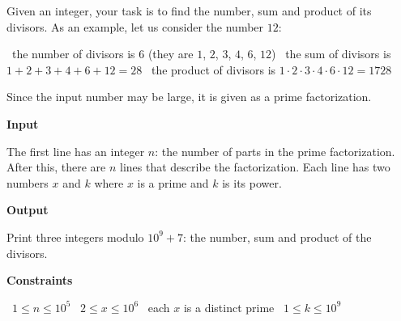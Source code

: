 Given an integer, your task is to find the number, sum and product of its divisors. As an example, let us consider the number $12$:

\textbullet\ the number of divisors is $6$ (they are $1$, $2$, $3$, $4$, $6$, $12$)
\textbullet\ the sum of divisors is $1+2+3+4+6+12=28$
\textbullet\ the product of divisors is $1 \cdot 2 \cdot 3 \cdot 4 \cdot 6 \cdot 12 = 1728$

Since the input number may be large, it is given as a prime factorization.

\vspace{0.3cm}\noindent\textbf{Input}

The first line has an integer $n$: the number of parts in the prime factorization.
After this, there are $n$ lines that describe the factorization. Each line has two numbers $x$ and $k$ where $x$ is a prime and $k$ is its power.

\vspace{0.3cm}\noindent\textbf{Output}

Print three integers modulo $10^9+7$: the number, sum and product of the divisors.

\vspace{0.3cm}\noindent\textbf{Constraints}

\textbullet\ $1 \le n \le 10^5$
\textbullet\ $2 \le x \le 10^6$
\textbullet\ each $x$ is a distinct prime
\textbullet\ $1 \le k \le 10^9$